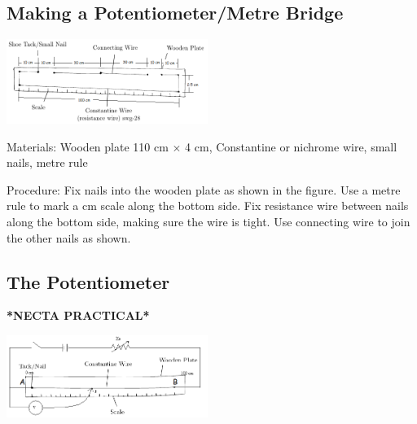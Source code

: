 \begin{multicols}{2}
\subsection{Making a Potentiometer/Metre Bridge}

\begin{center}
\includegraphics[width=0.49\textwidth]{./img/metre-bridge-2.png}
\end{center}

\begin{description*}
\item[Materials:]{Wooden plate 110 cm $\times$ 4 cm, Constantine or nichrome wire, small nails, metre rule}
\item[Procedure:]{Fix nails into the wooden plate as shown in the figure. Use a metre rule to mark a cm scale along the bottom side. Fix resistance wire between nails along the bottom side, making sure the wire is tight. Use connecting wire to join the other nails as shown.}
\end{description*}

\subsection{The Potentiometer}
\textbf{*NECTA PRACTICAL*}

\begin{center}
\includegraphics[width=0.49\textwidth]{./img/potentiometer.png}
\end{center}


\end{multicols}
